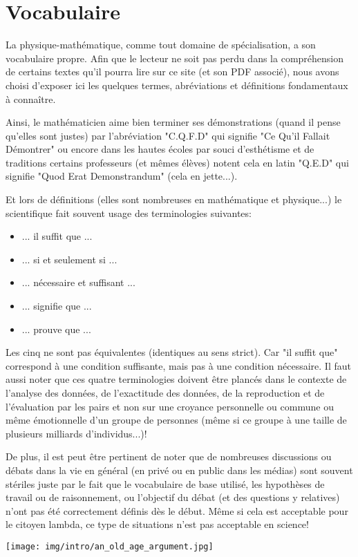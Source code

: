 	\newpage
	\thispagestyle{empty}
	\mbox{}
	\section{Vocabulaire}
	La physique-mathématique, comme tout domaine de spécialisation, a son vocabulaire propre. Afin que le lecteur ne soit pas perdu dans la compréhension de certains textes qu'il pourra lire sur ce site (et son PDF associé), nous avons choisi d'exposer ici les quelques termes, abréviations et définitions fondamentaux à connaître. 

	Ainsi, le mathématicien aime bien terminer ses démonstrations (quand il pense qu'elles sont justes) par l'abréviation "C.Q.F.D" qui signifie "Ce Qu'il Fallait Démontrer" ou encore dans les hautes écoles par souci d'esthétisme et de traditions certains professeurs (et mêmes élèves) notent cela en latin "Q.E.D" qui signifie "Quod Erat Demonstrandum" (cela en jette...).

	Et lors de définitions (elles sont nombreuses en mathématique et physique...) le scientifique fait souvent usage des terminologies suivantes:
	
	\begin{itemize}
	\item ... il suffit que  ...
	
	\item ... si et seulement si ...
	
	\item ... nécessaire et suffisant ...
	
	\item ... signifie que ...
	
	\item ... prouve que ...
	\end{itemize}
	Les cinq ne sont pas équivalentes (identiques au sens strict). Car "il suffit que" correspond à une condition suffisante, mais pas à une condition nécessaire. Il faut aussi noter que ces quatre terminologies doivent être plancés dans le contexte de l'analyse des données, de l'exactitude des données, de la reproduction et de l'évaluation par les pairs et non sur une croyance personnelle ou commune ou même émotionnelle d'un groupe de personnes (même si ce groupe à une taille de plusieurs milliards d'individus...)!
	
	De plus, il est peut être pertinent de noter que de nombreuses discussions ou débats dans la vie en général (en privé ou en public dans les médias) sont souvent stériles juste par le fait que le vocabulaire de base utilisé, les hypothèses de travail ou de raisonnement, ou l'objectif du débat (et des questions y relatives) n'ont pas été correctement définis dès le début. Même si cela est acceptable pour le citoyen lambda, ce type de situations n'est pas acceptable en science!
	\begin{center}
		\texttt{[image: img/intro/an\_old\_age\_argument.jpg]}
	\end{center}

